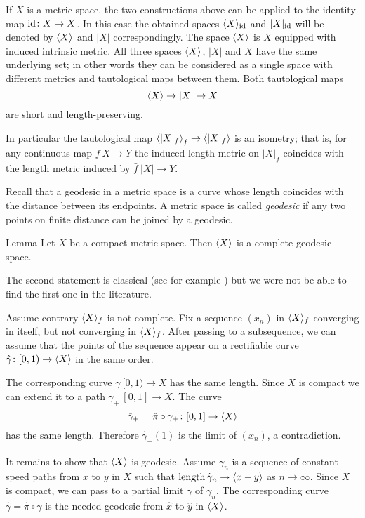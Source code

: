 \documentclass{article}
\begin{document}
If $X$ is a metric space, the two constructions above can be applied to the identity map $\mathrm{id}\colon X\to X$.
In this case the obtained spaces $\langle X\rangle_{\mathrm{id}}$ and $|X|_{\mathrm{id}}$ will be denoted by $\langle X\rangle$ and $|X|$ correspondingly.
The space $\langle X\rangle$ is $X$ equipped with induced intrinsic metric.
All three spaces $\langle X\rangle$, $|X|$ and $X$ have the same underlying set;
in other words they can be considered as a single space with different metrics and tautological maps between them.
Both tautological maps 
\[\langle X\rangle\to |X|\to X\]
are short and length-preserving.

In particular the tautological map $\<|X|_f\>_{\bar f}\zz\to \<|X|_f\>$ is an isometry;
that is, for any continuous map $f\:X\to Y$ the induced length metric on $|X|_f$ coincides with the length metric induced by 
$\bar f\:|X|\to Y$.


Recall that a geodesic in a metric space is a curve whose length coincides with the distance between its endpoints.
A metric space is called \emph{geodesic} if any two points on finite distance can be joined by a geodesic.

\begin{thm}{Lemma}\label{lem:geospace}
Let $X$ be a compact metric space. 
Then $\langle X\rangle$ is a complete geodesic space.
\end{thm}

The second statement is classical (see for example \cite[II-\S8 Thm. 3]{KF}) but 
we were not be able to find the first one in the literature.

Assume contrary $\langle X\rangle_f$ is not complete.
Fix a sequence $(x_n)$ in $\langle X\rangle_f$ converging in itself, but not converging in $\langle X\rangle_f$.
After passing to a subsequence, we can assume that the points of the sequence appear on a rectifiable curve $\hat\gamma\colon[0,1)\to\langle X\rangle$ in the same order.

The corresponding curve $\gamma\:[0,1)\to X$ has the same length.
Since $X$ is compact we can extend it to a path $\gamma_+\:[0,1]\to X$.
The curve 
\[\hat\gamma_+=\hat\pi\circ\gamma_+\colon[0,1]\to\langle X\rangle\]
has the same length.
Therefore $\hat\gamma_+(1)$ is the limit of $(x_n)$, a contradiction.

It remains to show that $\langle X\rangle$ is geodesic.
Assume $\gamma_n$ is a sequence of constant speed paths from $x$ to $y$ in $X$
such that $\mathop{\rm length}\nolimits\hat\gamma_n\to \langle x-y\rangle$ as $n\to\infty$.
Since $X$ is compact, we can pass to a partial limit $\gamma$ of  $\gamma_n$.
The corresponding curve $\hat\gamma=\hat \pi\circ\gamma$ is the needed geodesic from $\hat x$ to $\hat y$ in $\langle X\rangle$.
\qeds
\end{document}
